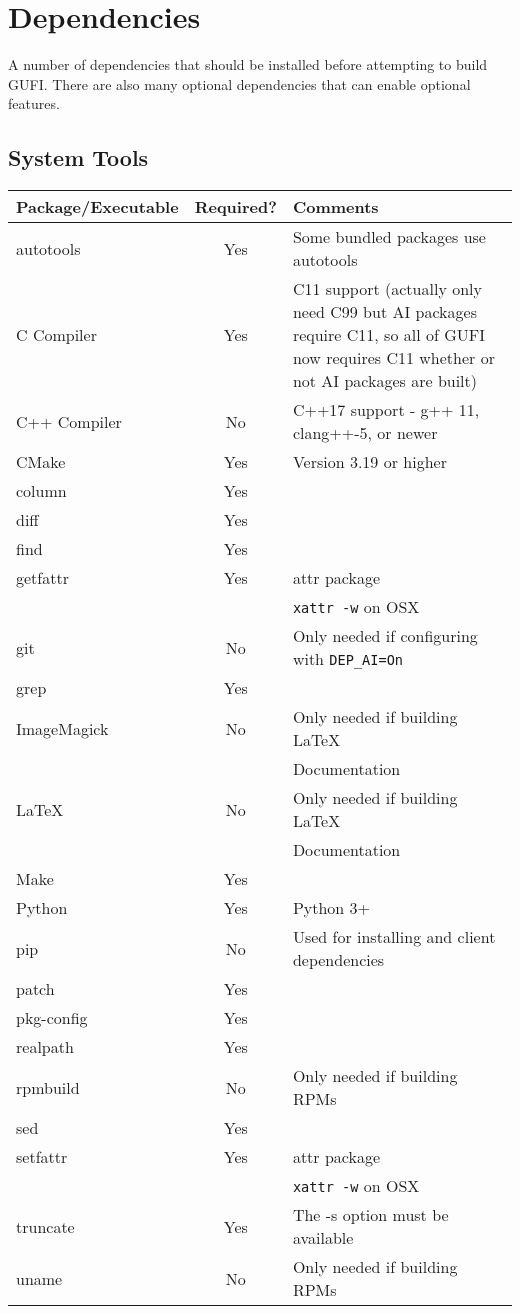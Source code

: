 \section{Dependencies}
A number of dependencies that should be installed before attempting to
build GUFI. There are also many optional dependencies that can enable
optional features.

\subsection{System Tools}
\begin{center}
\begin{tabularx}{\textwidth}{| l | c | X | }
  \hline
  Package/Executable & Required? & Comments \\
  \hline
  autotools & Yes & Some bundled packages use autotools \\
  \hline
  C Compiler & Yes & C11 support (actually only need C99 but AI
  packages require C11, so all of GUFI now requires C11 whether or not
  AI packages are built) \\
  \hline
  C++ Compiler & No & C++17 support - g++ 11, clang++-5, or newer
  \hfill \\
  \hline
  CMake & Yes & Version 3.19 or higher \\
  \hline
  column & Yes & \\
  \hline
  diff & Yes & \\
  \hline
  find & Yes & \\
  \hline
  getfattr & Yes & attr package \\
  & & \texttt{xattr -w} on OSX \\
  \hline
  git & No & Only needed if configuring with \texttt{DEP\_AI=On} \\
  \hline
  grep & Yes & \\
  \hline
  ImageMagick & No & Only needed if building \LaTeX \hfill \\
  & & Documentation \hfill \\
  \hline
  \LaTeX & No & Only needed if building \LaTeX \hfill \\
  & & Documentation \hfill \\
  \hline
  Make & Yes & \\
  \hline
  Python & Yes & Python 3+ \\
  \hline
  pip & No & Used for installing and client dependencies \\
  \hline
  patch & Yes & \\
  \hline
  pkg-config & Yes & \\
  \hline
  realpath & Yes & \\
  \hline
  rpmbuild & No & Only needed if building RPMs \\
  \hline
  sed & Yes & \\
  \hline
  setfattr & Yes & attr package \\
  & & \texttt{xattr -w} on OSX \\
  \hline
  truncate & Yes & The -s option must be available \\
  \hline
  uname & No & Only needed if building RPMs \\
  \hline
\end{tabularx}
\end{center}

